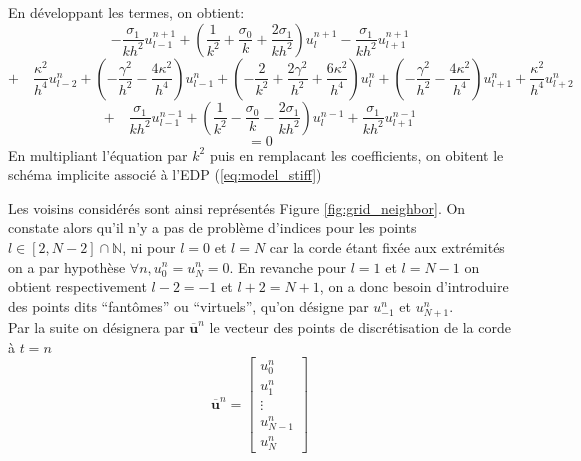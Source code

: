 \documentclass[a4,12pt]{article}
\newcommand{\N}{\mathbb{N}}
\newcommand{\ub}{\mathbf{u}}
\begin{document}
\begin{mdframed}[style=exempledefault,backgroundcolor=green!60]
\[\]
En développant les termes, on obtient:
\[
    -\frac{\sigma_{1}}{kh^2}u_{l-1}^{n+1}+(\frac{1}{k^2}+\frac{\sigma_{0}}{k}+\frac{2\sigma_{1}}{kh^2})u_l^{n+1}-\frac{\sigma_{1}}{kh^2}u_{l+1}^{n+1}
\]
\[
    +\quad\frac{\kappa^2}{h^4}u_{l-2}^n+(-\frac{\gamma ^2}{h^2}-\frac{4\kappa ^2}{h^4})u_{l-1}^n+(-\frac{2}{k^2}+\frac{2\gamma^2}{h^2}+\frac{6\kappa^2}{h^4})u_l^n+(-\frac{\gamma ^2}{h^2}-\frac{4\kappa ^2}{h^4})u_{l+1}^n+\frac{\kappa^2}{h^4}u_{l+2}^n
\]
\[
    +\quad\frac{\sigma_{1}}{kh^2}u_{l-1}^{n-1}+(\frac{1}{k^2}-\frac{\sigma_{0}}{k}-\frac{2\sigma_{1}}{kh^2})u_l^{n-1}+\frac{\sigma_{1}}{kh^2}u_{l+1}^{n-1}
\]
\[
    =0
\]
En multipliant l'équation par $k^2$ puis en remplacant les coefficients, on obitent le schéma implicite associé à l'EDP (\ref{eq:model_stiff})
\end{mdframed}


Les voisins considérés sont ainsi représentés Figure \ref{fig:grid_neighbor}. On constate alors qu'il n'y a pas de problème d'indices pour les points $l\in [2,N-2]\cap \N$, ni pour $l=0$ et $l=N$ car la corde étant fixée aux extrémités on a par hypothèse $\forall n, u_0^n=u_N^n=0$. En revanche pour $l=1$ et $l=N-1$ on obtient respectivement $l-2=-1$ et $l+2=N+1$, on a donc besoin d'introduire des points dits \enquote{fantômes} ou \enquote{virtuels}, qu'on désigne par $u_{-1}^n$ et $u_{N+1}^n$.\\

Par la suite on désignera par $\overline{\ub}^n$ le vecteur des points de discrétisation de la corde à $t=n$ 
\[
\overline{\ub}^n=\begin{bmatrix}u_0^n\\ u_1^n\\ \vdots \\ u_{N-1}^n \\ u_N^n\end{bmatrix}
\]

\end{document}
